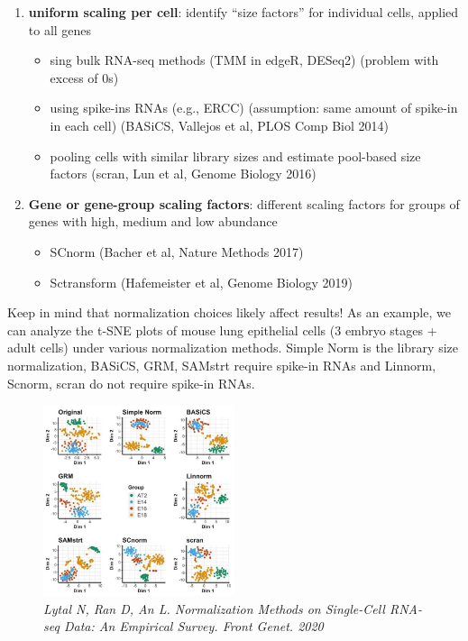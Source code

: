 \begin{enumerate}
\def\labelenumi{\arabic{enumi}.}
\tightlist
\item
  \textbf{uniform scaling per cell}: identify ``size factors'' for
  individual cells, applied to all genes

  \begin{itemize}
  \tightlist
  \item
    sing bulk RNA-seq methods (TMM in edgeR, DESeq2) (problem with
    excess of 0s)
  \item
    using spike-ins RNAs (e.g., ERCC) (assumption: same amount of
    spike-in in each cell) (BASiCS, Vallejos et al, PLOS Comp Biol 2014)
  \item
    pooling cells with similar library sizes and estimate pool-based
    size factors (scran, Lun et al, Genome Biology 2016)
  \end{itemize}
\item
  \textbf{Gene or gene-group scaling factors}: different scaling factors
  for groups of genes with high, medium and low abundance

  \begin{itemize}
  \tightlist
  \item
    SCnorm (Bacher et al, Nature Methods 2017)
  \item
    Sctransform (Hafemeister et al, Genome Biology 2019)
  \end{itemize}
\end{enumerate}

Keep in mind that normalization choices likely affect results! As an
example, we can analyze the t-SNE plots of mouse lung epithelial cells
(3 embryo stages + adult cells) under various normalization methods.
Simple Norm is the library size normalization, BASiCS, GRM, SAMstrt
require spike-in RNAs and Linnorm, Scnorm, scran do not require spike-in
RNAs.

\begin{figure}
\centering
\includegraphics[width=0.5\textwidth]{images/Screen_Shot_2023-02-22_at_15-08-31.png}
\caption{\emph{Lytal N, Ran D, An L. Normalization Methods on
Single-Cell RNA-seq Data: An Empirical Survey. Front Genet. 2020}}
\end{figure}

